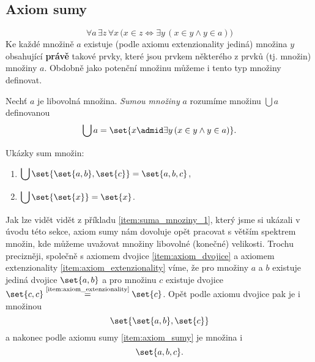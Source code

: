 \subsection{Axiom sumy}
\begin{equation*}
    \forall a\,\exists z\,\forall x\,\bigl(x\in z\iff \exists y\,(x\in y \land y\in a)\bigr)
\end{equation*}
Ke každé množině $a$ existuje (podle axiomu extenzionality jediná) množina $y$ obsahující \textbf{právě} takové prvky, které jsou prvkem některého z prvků (tj. množin) množiny $a$. Obdobně jako potenční množinu můžeme i tento typ množiny definovat.
\begin{definition}
    Nechť $a$ je libovolná množina. \emph{Sumou množiny} $a$ rozumíme množinu $\bigcup a$ definovanou
    \begin{equation*}
        \bigcup a=\set{x \admid \exists y\,(x\in y \land y\in a)}.
    \end{equation*}
\end{definition}
\begin{example}\label{ex:sumy_mnozin}
    Ukázky sum množin:
    \begin{enumerate}[label=(\roman*)]
        \item\label{item:suma_mnoziny_1} $\displaystyle\bigcup\set{\set{a,b},\set{c}}=\set{a,b,c}$,
        \item\label{item:suma_mnoziny_2} $\displaystyle\bigcup\set{\set{x}}=\set{x}$.
    \end{enumerate}
\end{example}
Jak lze vidět vidět z příkladu \ref{item:suma_mnoziny_1}, který jsme si ukázali v úvodu této sekce, axiom sumy nám dovoluje opět pracovat s větším spektrem množin, kde můžeme uvažovat množiny libovolné (konečné) velikosti. Trochu precizněji, společně s axiomem dvojice \ref{item:axiom_dvojice} a axiomem extenzionality \ref{item:axiom_extenzionality} víme, že pro množiny $a$ a $b$ existuje jediná dvojice $\set{a,b}$ a pro množinu $c$ existuje dvojice $\set{c,c}\stackrel{\text{\ref{item:axiom_extenzionality}}}{=}\set{c}$. Opět podle axiomu dvojice pak je i množinou
\begin{equation*}
    \set{\set{a,b},\set{c}}
\end{equation*}
a nakonec podle axiomu sumy \ref{item:axiom_sumy} je množina i
\begin{equation*}
    \set{a,b,c}.
\end{equation*}
\medskip

